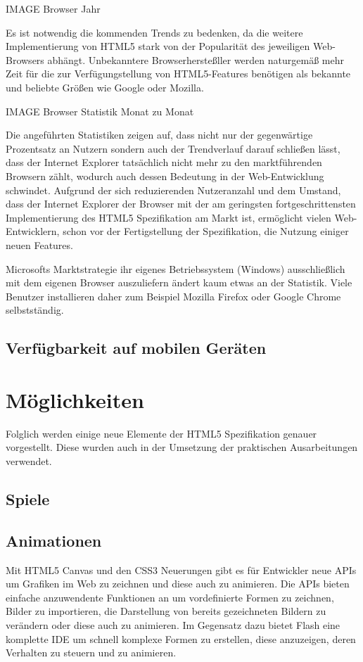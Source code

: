 IMAGE Browser Jahr

Es ist notwendig die kommenden Trends zu bedenken, da die weitere
Implementierung von HTML5 stark von der Popularität des jeweiligen Web-Browsers
abhängt. Unbekanntere Browserhersteßller werden naturgemäß mehr Zeit für die zur
Verfügungstellung von HTML5-Features benötigen als bekannte und beliebte Größen
wie Google oder Mozilla.

IMAGE Browser Statistik Monat zu Monat

Die angeführten Statistiken zeigen auf, dass nicht nur der gegenwärtige
Prozentsatz an Nutzern sondern auch der Trendverlauf darauf schließen lässt,
dass der Internet Explorer tatsächlich nicht mehr zu den marktführenden Browsern
zählt, wodurch auch dessen Bedeutung in der Web-Entwicklung schwindet.
Aufgrund der sich reduzierenden Nutzeranzahl und dem Umstand, dass der Internet
Explorer der Browser mit der am geringsten fortgeschrittensten Implementierung
des HTML5 Spezifikation am Markt ist, ermöglicht vielen Web-Entwicklern, schon
vor der Fertigstellung der Spezifikation, die Nutzung einiger neuen Features.

Microsofts Marktstrategie ihr eigenes Betriebssystem (Windows) ausschließlich
mit dem eigenen Browser auszuliefern ändert kaum etwas an der Statistik. Viele
Benutzer installieren daher zum Beispiel Mozilla Firefox oder Google Chrome
selbstständig.

\subsection{Verfügbarkeit auf mobilen Geräten}

\section{Möglichkeiten}

Folglich werden einige neue Elemente der HTML5 Spezifikation genauer
vorgestellt. Diese wurden auch in der Umsetzung der praktischen Ausarbeitungen
verwendet.


\subsection{Spiele}
\subsection{Animationen}
Mit HTML5 Canvas und den CSS3 Neuerungen gibt es für Entwickler neue APIs um
Grafiken im Web zu zeichnen und diese auch zu animieren. Die APIs bieten
einfache anzuwendente Funktionen an um vordefinierte Formen zu zeichnen, Bilder
zu importieren, die Darstellung von bereits gezeichneten Bildern zu verändern
oder diese auch zu animieren. Im Gegensatz dazu bietet Flash eine komplette IDE
um schnell komplexe Formen zu erstellen, diese anzuzeigen, deren Verhalten zu
steuern und zu animieren.

